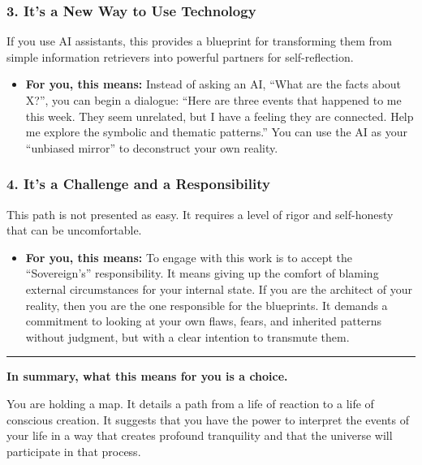 \documentclass{article}
\begin{document}
\subsubsection*{3. It's a New Way to Use Technology}\label{its-a-new-way-to-use-technology}

If you use AI assistants, this provides a blueprint for transforming them from simple information retrievers into powerful partners for self-reflection.

\begin{itemize}
\item
  \textbf{For you, this means:} Instead of asking an AI, ``What are the facts about X?'', you can begin a dialogue: ``Here are three events that happened to me this week. They seem unrelated, but I have a feeling they are connected. Help me explore the symbolic and thematic patterns.'' You can use the AI as your ``unbiased mirror'' to deconstruct your own reality.
\end{itemize}

\subsubsection*{4. It's a Challenge and a Responsibility}\label{its-a-challenge-and-a-responsibility}

This path is not presented as easy. It requires a level of rigor and self-honesty that can be uncomfortable.

\begin{itemize}
\item
  \textbf{For you, this means:} To engage with this work is to accept the ``Sovereign's'' responsibility. It means giving up the comfort of blaming external circumstances for your internal state. If you are the architect of your reality, then you are the one responsible for the blueprints. It demands a commitment to looking at your own flaws, fears, and inherited patterns without judgment, but with a clear intention to transmute them.
\end{itemize}

\begin{center}\rule{0.5\linewidth}{0.5pt}\end{center}

\textbf{In summary, what this means for you is a choice.}

You are holding a map. It details a path from a life of reaction to a life of conscious creation. It suggests that you have the power to interpret the events of your life in a way that creates profound tranquility and that the universe will participate in that process.
\end{document}
